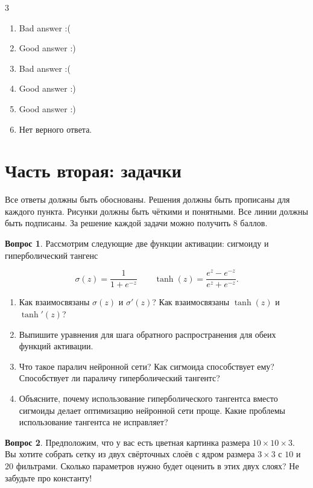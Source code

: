 \documentclass[12pt]{article}
\newenvironment{answerlist}[1][3]{
\begin{multicols}{#1}

\begin{enumerate}[label=\fbox{\emph{\Alph*}},ref=\emph{\alph*}]
}
{
\item Нет верного ответа.
\end{enumerate}
\end{multicols}
}
\theoremstyle{definition}
\newtheorem{question}{Вопрос}
\begin{document}
\begin{solution}
\begin{answerlist}
  \item Bad answer :(
  \item Good answer :)
  \item Bad answer :(
  \item Good answer :)
  \item Good answer :)
\end{answerlist}
\end{solution}

\newpage 

 
\section*{Часть вторая: задачки}

Все ответы должны быть обоснованы. Решения должны быть прописаны для каждого пункта. Рисунки должны быть чёткими и понятными. Все линии должны быть подписаны. За решение каждой задачи можно получить 8 баллов.

\begin{question}
    Рассмотрим следующие две функции активации: сигмоиду и гиперболический тангенс 
    
    \[
    \sigma(z) = \frac{1}{1 + e^{-z}} \qquad \tanh(z) = \frac{e^z - e^{-z}}{e^z + e^{-z}}.
    \]
    
    \begin{enumerate}
    \item Как взаимосвязаны $\sigma(z)$ и $\sigma'(z)$?  Как взаимосвязаны $\tanh(z)$ и $\tanh'(z)$? 
    \item Выпишите уравнения для шага обратного распространения для обеих функций активации. 
    \item Что такое паралич нейронной сети? Как сигмоида способствует ему? Способствует ли параличу гиперболический тангентс? 
    \item Объясните, почему использование гиперболического тангентса вместо сигмоиды делает оптимизацию нейронной сети проще. Какие проблемы использование тангентса не исправляет?
    \end{enumerate} 
\end{question}


\newpage 

\begin{question}
Предположим, что у вас есть цветная картинка размера $10 \times 10 \times 3$. Вы хотите собрать сетку из двух свёрточных слоёв с ядром размера $3 \times 3$ с $10$ и $20$ фильтрами. Сколько параметров нужно будет оценить в этих двух слоях? Не забудьте про константу! 
\end{question}
\end{document}
